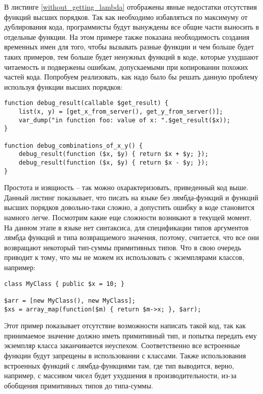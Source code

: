 В листинге \ref{without_getting_lambda} отображены явные недостатки отсутствия функций высших порядков.
Так как необходимо избавляться по максимуму от дублирования кода, программисты будут вынуждены все общие части выносить в отдельные функции.
На этом примере также показана необходимость создания временных имен для того, чтобы вызывать разные функции и чем больше будет таких примеров, тем больше будет ненужных функций в коде, которые ухудшают читаемость и подвержены ошибкам, допускаемыми при копировании похожих частей кода.
Попробуем реализовать, как надо было бы решать данную проблему используя функции высших порядков:
\begin{lstlisting}
function debug_result(callable $get_result) {
	list(x, y) = [get_x_from_server(), get_y_from_server()];
	var_dump("in function foo: value of x: ".$get_result($x));
}

function debug_combinations_of_x_y() {
	debug_result(function ($x, $y) { return $x + $y; });
	debug_result(function ($x, $y) { return $x - $y; });
}
\end{lstlisting}

Простота и изящность -- так можно охарактеризовать, приведенный код выше.
Данный листинг показывает, что писать на языке без лямбда-функций и функций высших порядков довольно-таки сложно, а допустить ошибку в коде становится намного легче.
Посмотрим какие еще сложности возникают в текущей момент.
На данном этапе в языке нет синтаксиса, для спецификации типов аргументов лямбда функций и типа возвращаемого значения, поэтому, считается, что все они возвращают некоторый тип-суммы примитивных типов.
Что в свою очередь приводит к тому, что мы не можем их использовать с экземплярами классов, например:
\begin{lstlisting}
class MyClass { public $x = 10; }

$arr = [new MyClass(), new MyClass];
$xs = array_map(function($m) { return $m->x; }, $arr);
\end{lstlisting}

Этот пример показывает отсутствие возможности написать такой код, так как принимаемое значение должно иметь примитивный тип, и попытка передать ему экземпляр класса заканчивается неуспехом.
Соответственно все встроенные функции будут запрещены в использовании с классами.
Также использования встроенных функций с лямбда-функциями там, где тип выводится, верно, например, с массивом чисел будет ухудшения в производительности, из-за обобщения примитивных типов до типа-суммы.
\finishrelatedwork

